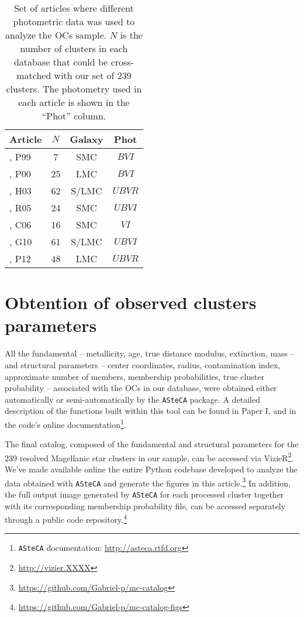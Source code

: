 \documentclass{aa}
\begin{document}
\begin{table}
\centering
  \caption{Set of articles where different photometric data was used to analyze
  the OCs sample.
  $N$ is the number of clusters in each database that could be cross-matched
  with our set of 239 clusters. The photometry used in each article is shown in
  the ``Phot'' column.}
\label{tab:databases}
 \begin{tabular}{l c c c}
\hline\hline
Article & $N$ & Galaxy & Phot\\
\hline
\cite{Pietrzynski1999}, P99 & 7 & SMC & $BVI$ \\ 
\cite{Pietrzynski2000}, P00 & 25 & LMC & $BVI$ \\ 
\cite{Hunter_2003}, H03 & 62 & S/LMC & $UBVR$ \\ 
\cite{Rafelski_2005}, R05 & 24 & SMC & $UBVI$ \\ 
\cite{Chiosi_2006}, C06 & 16 & SMC & $VI$ \\ 
\cite{Glatt_2010}, G10 & 61 & S/LMC & $UBVI$ \\ 
\cite{Popescu_2012}, P12 & 48 & LMC & $UBVR$ \\ 
\hline
 \end{tabular} 
\end{table}
  




\section{Obtention of observed clusters parameters}
\label{sec:fund-params}

All the fundamental -- metallicity, age, true distance modulus,
extinction, mass -- and structural parameters -- center coordinates, radius,
contamination index, approximate number of members, membership probabilities,
true cluster probability -- associated with the OCs in our database, were
obtained either automatically or semi-automatically by the \texttt{ASteCA}
package.
%
A detailed description of the functions built within this tool can be found in
Paper I, and in the code's online documentation\footnote{\texttt{ASteCA}
documentation: \url{http://asteca.rtfd.org}}.
  
The final catalog, composed of the fundamental and structural parameters for
the 239 resolved Magellanic star clusters in our sample, can be
accessed via VizieR\footnote{\url{http://vizier.XXXX}}.
We've made available online the entire Python codebase developed to analyze
the data obtained with \texttt{ASteCA} and generate the figures in this
article.\footnote{\url{https://github.com/Gabriel-p/mc-catalog}}
%
In addition, the full output image generated by \texttt{ASteCA} for each
processed cluster together with its corresponding membership probability file,
can be accessed separately through a public code
repository.\footnote{\url{https://github.com/Gabriel-p/mc-catalog-figs}}
\end{document}
